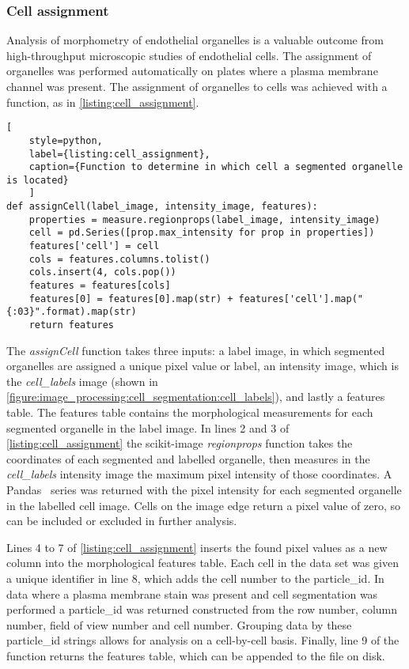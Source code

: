 \subsubsection{Cell assignment}
\label{endothelial_morphometry:image_processing:cell_assignment}
Analysis of morphometry of endothelial organelles is a valuable outcome from high-throughput microscopic studies of endothelial cells. The assignment of organelles was performed automatically on plates where a plasma membrane channel was present. The assignment of organelles to cells was achieved with a function, as in \autoref{listing:cell_assignment}.

\begin{lstlisting}[
	style=python,
	label={listing:cell_assignment},
	caption={Function to determine in which cell a segmented organelle is located}
	]
def assignCell(label_image, intensity_image, features):
    properties = measure.regionprops(label_image, intensity_image)
    cell = pd.Series([prop.max_intensity for prop in properties])
    features['cell'] = cell
    cols = features.columns.tolist()
    cols.insert(4, cols.pop())
    features = features[cols]
    features[0] = features[0].map(str) + features['cell'].map("{:03}".format).map(str)
    return features
\end{lstlisting}

The \emph{assignCell} function takes three inputs: a label image, in which segmented organelles are assigned a unique pixel value or label, an intensity image, which is the \emph{cell\_labels} image (shown in \autoref{figure:image_processing:cell_segmentation:cell_labels}), and lastly a features table. The features table contains the morphological measurements for each segmented organelle in the label image. In lines 2 and 3 of \autoref{listing:cell_assignment} the scikit-image \emph{regionprops} function takes the coordinates of each segmented and labelled organelle, then measures in the \emph{cell\_labels} intensity image the maximum pixel intensity of those coordinates. A Pandas~\cite{McKinney2011} series was returned with the pixel intensity for each segmented organelle in the labelled cell image. Cells on the image edge return a pixel value of zero, so can be included or excluded in further analysis.

Lines 4 to 7 of \autoref{listing:cell_assignment} inserts the found pixel values as a new column into the morphological features table. Each cell in the data set was given a unique identifier in line 8, which adds the cell number to the particle\_id. In data where a plasma membrane stain was present and cell segmentation was performed a particle\_id was returned constructed from the row number, column number, field of view number and cell number. Grouping data by these particle\_id strings allows for analysis on a cell-by-cell basis. Finally, line 9 of the function returns the features table, which can be appended to the file on disk.

